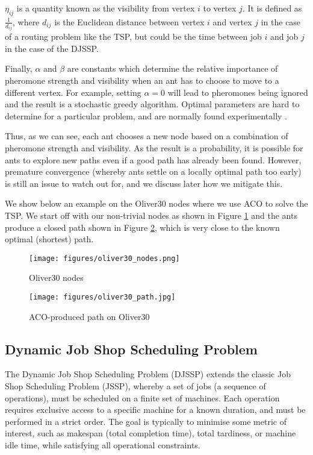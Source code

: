\documentclass[final-report]{report-template}
\begin{document}
$\eta_{ij}$ is a quantity known as the visibility from vertex $i$ to vertex $j$. It is defined as $\frac{1}{d_{ij}}$, where $d_{ij}$ is the Euclidean distance between vertex $i$ and vertex $j$ in the case of a routing problem like the TSP, but could be the time between job $i$ and job $j$ in the case of the DJSSP. 

Finally, $\alpha$ and $\beta$ are constants which determine the relative importance of pheromone strength and visibility when an ant has to choose to move to a different vertex. For example, setting $\alpha = 0$ will lead to pheromones being ignored and the result is a stochastic greedy algorithm. Optimal parameters are hard to determine for a particular problem, and are normally found experimentally \cite{ant_parameters}.

Thus, as we can see, each ant chooses a new node based on a combination of pheromone strength and visibility. As the result is a probability, it is possible for ants to explore new paths even if a good path has already been found. However, premature convergence (whereby ants settle on a locally optimal path too early) is still an issue to watch out for, and we discuss later how we mitigate this.

We show below an example on the Oliver30 nodes \cite{oliver30} where we use ACO to solve the TSP. We start off with our non-trivial nodes as shown in Figure \ref{fig:oliver30-nodes} and the ants produce a closed path shown in Figure \ref{fig:oliver30-path}, which is very close to the known optimal (shortest) path.


\begin{figure}[H]
    \centering
    \texttt{[image: figures/oliver30\_nodes.png]}
    \caption{Oliver30 nodes}
    \label{fig:oliver30-nodes}
\end{figure}

\begin{figure}[H]
    \centering
    \texttt{[image: figures/oliver30\_path.jpg]}
    \caption{ACO-produced path on Oliver30}
    \label{fig:oliver30-path}
\end{figure}


\subsection{Dynamic Job Shop Scheduling Problem}

The Dynamic Job Shop Scheduling Problem (DJSSP) extends the classic Job Shop Scheduling Problem (JSSP), whereby a set of jobs (a sequence of operations), must be scheduled on a finite set of machines. Each operation requires exclusive access to a specific machine for a known duration, and must be performed in a strict order. The goal is typically to minimise some metric of interest, such as makespan (total completion time), total tardiness, or machine idle time, while satisfying all operational constraints.
\end{document}
